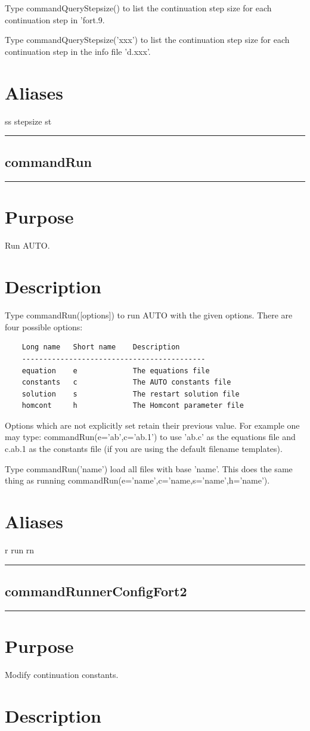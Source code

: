 \documentclass[12pt]{report}
\begin{document}
\begin{minipage}{6in}
    Type commandQueryStepsize() to list the continuation step size for each
    continuation step in  'fort.9. 

    Type commandQueryStepsize('xxx') to list the continuation step size for each
    continuation step in the info file 'd.xxx'.
    \section*{Aliases}
ss stepsize st \medskip\hrule\end{minipage}\subsection{commandRun} \label{sec:clui_ref_commandRun}\begin{minipage}{6in}\hrule\medskip\section*{Purpose}
Run AUTO.\section*{Description}

    Type commandRun([options]) to run AUTO with the given options.
    There are four possible options:
    \begin{verbatim}
    Long name   Short name    Description
    -------------------------------------------
    equation    e             The equations file
    constants   c             The AUTO constants file
    solution    s             The restart solution file
    homcont     h             The Homcont parameter file
    \end{verbatim}
    Options which are not explicitly set retain their previous value.
    For example one may type: commandRun(e='ab',c='ab.1') to use 'ab.c' as
    the equations file and c.ab.1 as the constants file (if you are
    using the default filename templates).

    Type commandRun('name') load all files with base 'name'.
    This does the same thing as running
    commandRun(e='name',c='name,s='name',h='name').
    \section*{Aliases}
r run rn \medskip\hrule\end{minipage}\subsection{commandRunnerConfigFort2} \label{sec:clui_ref_commandRunnerConfigFort2}\begin{minipage}{6in}\hrule\medskip\section*{Purpose}
Modify continuation constants.\section*{Description}


\end{minipage}
\end{document}
